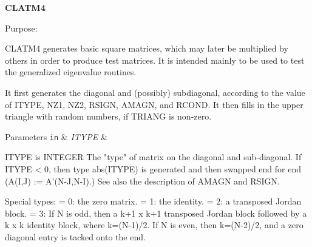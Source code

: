 {\bfseries C\+L\+A\+T\+M4} 

\begin{DoxyParagraph}{Purpose\+: }
\begin{DoxyVerb} CLATM4 generates basic square matrices, which may later be
 multiplied by others in order to produce test matrices.  It is
 intended mainly to be used to test the generalized eigenvalue
 routines.

 It first generates the diagonal and (possibly) subdiagonal,
 according to the value of ITYPE, NZ1, NZ2, RSIGN, AMAGN, and RCOND.
 It then fills in the upper triangle with random numbers, if TRIANG is
 non-zero.\end{DoxyVerb}
 
\end{DoxyParagraph}

\begin{DoxyParams}[1]{Parameters}
\mbox{\tt in}  & {\em I\+T\+Y\+P\+E} & \begin{DoxyVerb}          ITYPE is INTEGER
          The "type" of matrix on the diagonal and sub-diagonal.
          If ITYPE < 0, then type abs(ITYPE) is generated and then
             swapped end for end (A(I,J) := A'(N-J,N-I).)  See also
             the description of AMAGN and RSIGN.

          Special types:
          = 0:  the zero matrix.
          = 1:  the identity.
          = 2:  a transposed Jordan block.
          = 3:  If N is odd, then a k+1 x k+1 transposed Jordan block
                followed by a k x k identity block, where k=(N-1)/2.
                If N is even, then k=(N-2)/2, and a zero diagonal entry
                is tacked onto the end.


\end{DoxyVerb}
\end{DoxyParams}
